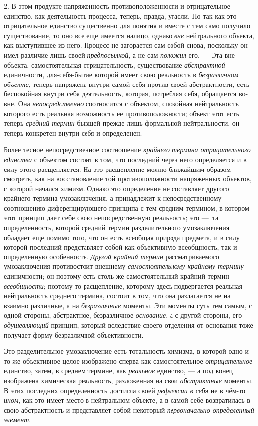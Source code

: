 \documentclass[twoside]{article}
\begin{document}
{{{2. В этом продукте напряженность противоположенности и
отрицательное единство, как деятельность процесса, теперь, правда, угасли.
Но так как это отрицательное единство существенно для понятия и вместе с
тем само получило существование, то оно все еще имеется налицо, однако
{\em вне} нейтрального
объекта, как выступившее из него. Процесс не загорается сам собой снова,
поскольку он имел различие лишь своей
{\em предпосылкой}, а не
сам {\em положил} его. —
Эта вне объекта, самостоятельная отрицательность,
существование {\em абстрактной}
единичности, для-себя-бытие которой имеет свою реальность в
{\em безразличном объекте},
теперь напряжена внутри самой себя против своей
абстрактности, есть беспокойная внутри себя деятельность, которая,
потребляя себя, обращается во-вне. Она
{\em непосредственно}
соотносится с объектом, спокойная нейтральность которого есть
реальная возможность ее противоположности; объект этот есть теперь
{\em средний термин}
бывшей прежде лишь формальной нейтральности, он теперь
конкретен внутри себя и определенен.

Более тесное непосредственное соотношение
{\em крайнего термина отрицательного
единства} с объектом состоит в том, что последний через него
определяется и в силу этого расщепляется. На это расщепление можно
ближайшим образом смотреть, как на восстановление той противоположности
напряженных объектов, с которой начался химизм. Однако это определение не
составляет другого крайнего термина умозаключения, а принадлежит к
непосредственному соотношению диференцирующего принципа с тем средним
термином, в котором этот принцип дает себе свою непосредственную
реальность; это —~та определенность, которой средний термин
разделительного умозаключения обладает еще помимо того, что он есть
всеобщая природа предмета, и в силу которой последний представляет собой
как объективную всеобщность, так и определенную особенность.
{\em Другой крайний термин}
рассматриваемого умозаключения противостоит внешнему
{\em самостоятельному крайнему термину}
единичности; он поэтому есть столь же самостоятельный крайний
термин {\em всеобщности};
поэтому то расщепление, которому здесь подвергается реальная
нейтральность среднего термина, состоит в том, что она разлагается не на
взаимно различные, а на
{\em безразличные}
моменты. Эти моменты суть тем самым, с одной стороны,
абстрактное, безразличное
{\em основание}, а с
другой стороны, его {\em одушевляющий}
принцип, который вследствие своего отделения
от основания тоже получает форму безразличной объективности.

Это разделительное умозаключение есть тотальность химизма, в
которой одно и то же объективное целое изображено сперва как
самостоятельное {\em отрицательное}
единство, затем, в среднем термине, как
{\em реальное} единство,
— а под конец изображена химическая реальность, разложенная
на свои {\em абстрактные}
моменты. В этих последних определенность достигла своей
{\em рефлексии в себя} не
в чём-то {\em ином},
как это имеет место в нейтральном объекте, а в самой себе
возвратилась в свою абстрактность и представляет собой некоторый
{\em первоначально определенный
элемент}.

}}}
\end{document}

